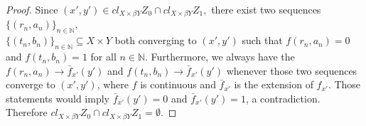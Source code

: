 \documentclass{amsart}
\begin{document}
\begin{proof}
Since $(x',y') \in cl_{X\times \beta Y} Z_0 \cap cl_{X\times \beta Y}Z_1,$ there exist two sequences $\{(r_n,a_n)\}_{n\in\mathbb{N}}$, \\$ \{(t_n,b_n)\}_{n\in\mathbb{N}} \subseteq X\times Y$ both converging to $(x',y')$ such that $f(r_n,a_n)=0$ and $f(t_n,b_n)=1$ for all $n\in \mathbb{N}$. 
Furthermore, we always have the $f(r_n,a_n)\rightarrow \bar{f}_{x'}(y')$ and $f(t_n,b_n)\rightarrow \bar{f}_{x'}(y')$ whenever those two sequences converge to $(x',y')$, where $f$ is continuous and $\bar{f}_{x'}$ is the extension of $f_{x'}$. Those statements would imply $\bar{f}_{x'}(y')=0$ and $\bar{f}_{x'}(y')=1$, a contradiction. Therefore $cl_{X\times \beta Y} Z_0 \cap cl_{X\times \beta Y}Z_1 = \emptyset.$





\end{proof}
\end{document}
